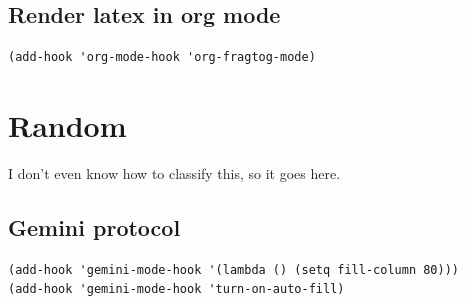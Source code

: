 \documentclass[10pt]{article}
\begin{document}
\subsection{Render latex in org mode}
\label{sec:org50ccfd0}
\begin{verbatim}
(add-hook 'org-mode-hook 'org-fragtog-mode)
\end{verbatim}
\section{Random}
\label{sec:orgeb73d6c}

I don't even know how to classify this, so it goes here.
\subsection{Gemini protocol}
\label{sec:org6957dc2}
\begin{verbatim}
(add-hook 'gemini-mode-hook '(lambda () (setq fill-column 80)))
(add-hook 'gemini-mode-hook 'turn-on-auto-fill)
\end{verbatim}
\end{document}
